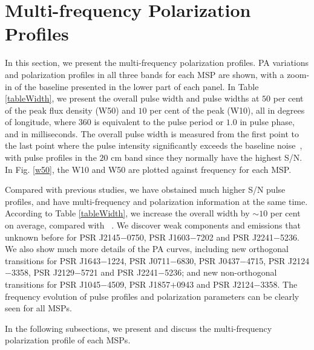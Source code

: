 \documentclass[useAMS,usenatbib]{mn2e}
\begin{document}
\section{Multi-frequency Polarization Profiles}

In this section, we present the multi-frequency polarization profiles. 
%
PA variations and polarization profiles in all three bands for each MSP 
are shown, with a zoom-in of the baseline presented in the lower part of each 
panel.
%
In Table \ref{tableWidth}, we present the overall pulse width and pulse 
widths at $50$ per cent of the peak flux density (W50) and $10$ per cent 
of the peak (W10), all in degrees of longitude, where $360$ is equivalent 
to the pulse period or $1.0$ in pulse phase, and in milliseconds.
%
The overall pulse width is measured from the first point to the last point 
where the pulse intensity significantly exceeds the baseline 
noise~\citep{Yan11}, with pulse profiles in the $20$ cm band since they 
normally have the highest S/N.
%
%
%
In Fig. \ref{w50}, the W10 and W50 are plotted against frequency for each MSP. 
%

Compared with previous studies, we have obstained much higher S/N pulse 
profiles, and have multi-frequency and polarization information at the same 
time.
%
According to Table \ref{tableWidth}, we increase the overall width by $\sim10$ per 
cent on average, compared with ~\citet{Yan11}. 
%
We discover weak components and emissions that unknown before for PSR J2145$-$0750, 
PSR J1603$-$7202 and PSR J2241$-$5236.
%
We also show much more details of the PA curves, including new orthogonal 
transitions for PSR J1643$-$1224, PSR J0711$-$6830, PSR J0437$-$4715, PSR J2124$-$3358, 
PSR J2129$-$5721 and PSR J2241$-$5236; and new non-orthogonal transitions for 
PSR J1045$-$4509, PSR J1857$+$0943 and PSR J2124$-$3358.
%
The frequency evolution of pulse profiles and polarization parameters 
can be clearly seen for all MSPs.

In the following subsections, we present and discuss the multi-frequency 
polarization profile of each MSPs.
%
\end{document}
